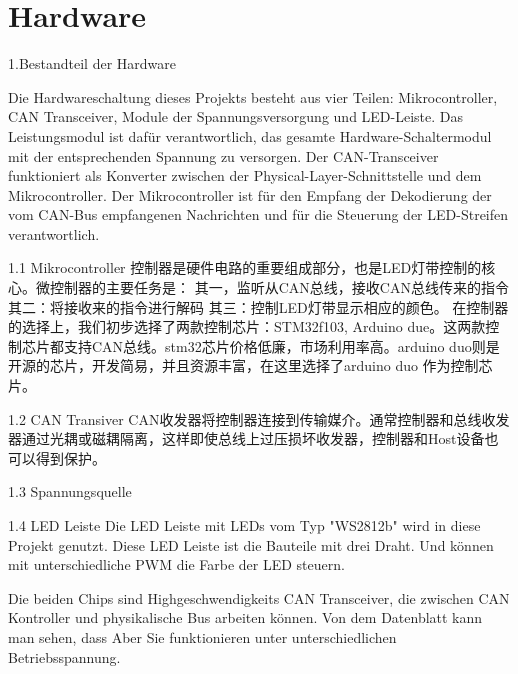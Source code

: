 
\chapter{Hardware}
\label{cha:Hardware}

1.Bestandteil der Hardware

Die Hardwareschaltung dieses Projekts besteht aus vier Teilen: Mikrocontroller, CAN Transceiver, Module der Spannungsversorgung und LED-Leiste. Das Leistungsmodul ist dafür verantwortlich, das gesamte Hardware-Schaltermodul mit der entsprechenden Spannung zu versorgen. Der CAN-Transceiver funktioniert als Konverter zwischen der Physical-Layer-Schnittstelle und dem Mikrocontroller. Der Mikrocontroller ist für den Empfang der Dekodierung der vom CAN-Bus empfangenen Nachrichten und für die Steuerung der LED-Streifen verantwortlich.


1.1 Mikrocontroller
控制器是硬件电路的重要组成部分，也是LED灯带控制的核心。微控制器的主要任务是：
	其一，监听从CAN总线，接收CAN总线传来的指令
	其二：将接收来的指令进行解码
	其三：控制LED灯带显示相应的颜色。
在控制器的选择上，我们初步选择了两款控制芯片：STM32f103, Arduino due。这两款控制芯片都支持CAN总线。stm32芯片价格低廉，市场利用率高。arduino duo则是开源的芯片，开发简易，并且资源丰富，在这里选择了arduino duo 作为控制芯片。

1.2 CAN Transiver
CAN收发器将控制器连接到传输媒介。通常控制器和总线收发器通过光耦或磁耦隔离，这样即使总线上过压损坏收发器，控制器和Host设备也可以得到保护。

1.3 Spannungsquelle

1.4 LED Leiste
	Die LED Leiste mit LEDs vom Typ "WS2812b" wird in diese Projekt genutzt. Diese LED Leiste ist die Bauteile mit drei Draht. Und können mit unterschiedliche PWM die Farbe der LED steuern.



Die beiden Chips sind Highgeschwendigkeits CAN Transceiver, die zwischen CAN Kontroller und physikalische  Bus arbeiten können. Von dem Datenblatt kann man sehen, dass Aber Sie funktionieren unter unterschiedlichen Betriebsspannung. 


